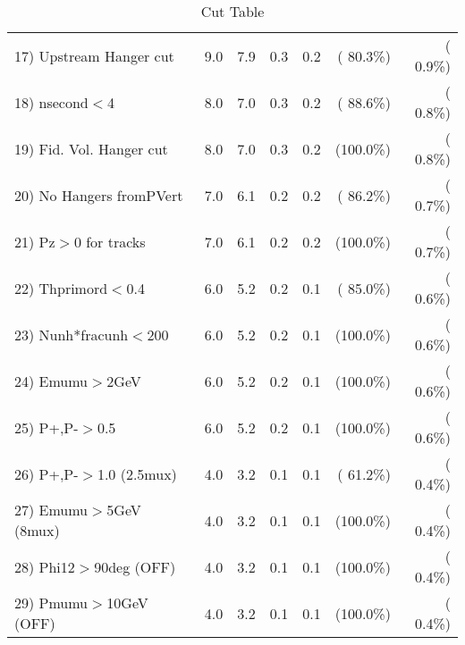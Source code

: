 \begin{table}[h!]
\begin{tabular}{||l||r|r|r|r|r|r||}
 17) Upstream Hanger cut  &          9.0 &          7.9 &          0.3 &          0.2 & ( 80.3\%) & (  0.9\%) \\
 18) nsecond$<$4          &          8.0 &          7.0 &          0.3 &          0.2 & ( 88.6\%) & (  0.8\%) \\
 19) Fid. Vol. Hanger cut &          8.0 &          7.0 &          0.3 &          0.2 & (100.0\%) & (  0.8\%) \\
 20) No Hangers fromPVert &          7.0 &          6.1 &          0.2 &          0.2 & ( 86.2\%) & (  0.7\%) \\
 21) Pz$>$0 for tracks    &          7.0 &          6.1 &          0.2 &          0.2 & (100.0\%) & (  0.7\%) \\
 22) Thprimord$<$0.4      &          6.0 &          5.2 &          0.2 &          0.1 & ( 85.0\%) & (  0.6\%) \\
 23) Nunh*fracunh$<$200   &          6.0 &          5.2 &          0.2 &          0.1 & (100.0\%) & (  0.6\%) \\
 24) Emumu$>$2GeV         &          6.0 &          5.2 &          0.2 &          0.1 & (100.0\%) & (  0.6\%) \\
 25) P+,P-$>$0.5          &          6.0 &          5.2 &          0.2 &          0.1 & (100.0\%) & (  0.6\%) \\
 26) P+,P-$>$1.0 (2.5mux) &          4.0 &          3.2 &          0.1 &          0.1 & ( 61.2\%) & (  0.4\%) \\
 27) Emumu$>$5GeV  (8mux) &          4.0 &          3.2 &          0.1 &          0.1 & (100.0\%) & (  0.4\%) \\
 28) Phi12$>$90deg  (OFF) &          4.0 &          3.2 &          0.1 &          0.1 & (100.0\%) & (  0.4\%) \\
 29) Pmumu$>$10GeV  (OFF) &          4.0 &          3.2 &          0.1 &          0.1 & (100.0\%) & (  0.4\%) \\
 \hline
 \hline
 \end{tabular}
 \caption{Cut Table           }
 \label{tab-cutcohjpsi-mumu_cohrho0}
 \end{table}
